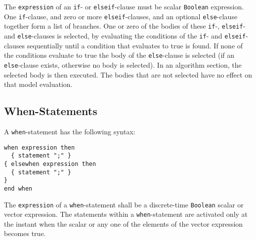 The \lstinline!expression! of an \lstinline!if!- or \lstinline!elseif!-clause must be scalar \lstinline!Boolean! expression.
One \lstinline!if!-clause, and zero or more \lstinline!elseif!-clauses, and an optional \lstinline!else!-clause together form a list of branches.
One or zero of the bodies of these \lstinline!if!-, \lstinline!elseif!- and \lstinline!else!-clauses is selected, by evaluating the conditions of the \lstinline!if!- and \lstinline!elseif!-clauses sequentially until a condition that evaluates to true is found.
If none of the conditions evaluate to true the body of the \lstinline!else!-clause is selected (if an \lstinline!else!-clause exists, otherwise no body is selected).
In an algorithm section, the selected body is then executed.
The bodies that are not selected have no effect on that model evaluation.

\subsection{When-Statements}\label{when-statements}

A \lstinline!when!-statement has the following syntax:
\begin{lstlisting}[language=grammar]
when expression then
  { statement ";" }
{ elsewhen expression then
  { statement ";" }
}
end when
\end{lstlisting}

The \lstinline!expression! of a \lstinline!when!-statement shall be a discrete-time \lstinline!Boolean! scalar or vector expression.
The statements within a \lstinline!when!-statement are activated only at the instant when the scalar or any one of the elements of the vector expression becomes true.

